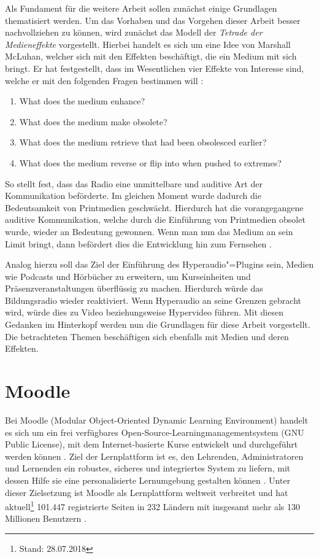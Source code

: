 \label{cha:grundlagen}
Als Fundament für die weitere Arbeit sollen zunächst einige Grundlagen thematisiert werden. Um das Vorhaben und das Vorgehen dieser Arbeit besser nachvollziehen zu können, wird zunächst das Modell der \textit{Tetrade der Medieneffekte} vorgestellt. Hierbei handelt es sich um eine Idee von Marshall McLuhan, welcher sich mit den Effekten beschäftigt, die ein Medium mit sich bringt. Er hat festgestellt, dass im Wesentlichen vier Effekte von Interesse sind, welche er mit den folgenden Fragen bestimmen will \citep{mcluhan1977laws}:

\begin{enumerate}
\item What does the medium enhance?
\item What does the medium make obsolete?
\item What does the medium retrieve that had been obsolesced earlier?
\item What does the medium reverse or flip into when pushed to extremes?
\end{enumerate}

So stellt \cite{mcluhan1977laws} fest, dass das Radio eine unmittelbare und auditive Art der Kommunikation beförderte. Im gleichen Moment wurde dadurch die Bedeutsamkeit von Printmedien geschwächt. Hierdurch hat die vorangegangene auditive Kommunikation, welche durch die Einführung von Printmedien obsolet wurde, wieder an Bedeutung gewonnen. Wenn man nun das Medium an sein Limit bringt, dann befördert dies die Entwicklung hin zum Fernsehen \citep{mcluhan1977laws}.

Analog hierzu soll das Ziel der Einführung des Hyperaudio"=Plugins sein, Medien wie Podcasts und Hörbücher zu erweitern, um Kurseinheiten und Präsenzveranstaltungen überflüssig zu machen. Hierdurch würde das Bildungsradio wieder reaktiviert. Wenn Hyperaudio an seine Grenzen gebracht wird, würde dies zu Video beziehungsweise Hypervideo führen. Mit diesen Gedanken im Hinterkopf werden nun die Grundlagen für diese Arbeit vorgestellt. Die betrachteten Themen beschäftigen sich ebenfalls mit Medien und deren Effekten.

\section{Moodle}
\label{sec:moodle}
Bei Moodle (Modular Object-Oriented Dynamic Learning Environment) handelt es sich um ein frei verfügbares Open-Source-Learningmanagementsystem (GNU Public License), mit dem Internet-basierte Kurse entwickelt und durchgeführt werden können \citep{moodle2015was}. Ziel der Lernplattform ist es, den Lehrenden, Administratoren und Lernenden ein robustes, sicheres und integriertes System zu liefern, mit dessen Hilfe sie eine personalisierte Lernumgebung gestalten können \citep{moodle2018about}. Unter dieser Zielsetzung ist Moodle als Lernplattform weltweit verbreitet und hat aktuell\footnote{Stand: 28.07.2018} 101.447 registrierte Seiten in 232 Ländern mit insgesamt mehr als 130 Millionen Benutzern \citep{moodle2018stats}.


